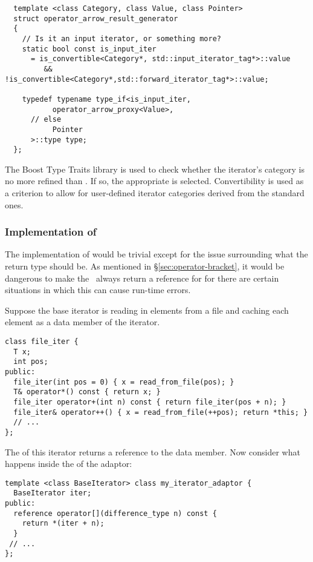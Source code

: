 \documentclass{netobjectdays}
\newcommand{\iteratoradaptor}{\code{iterator\_\-adaptor}}
\begin{document}
{\footnotesize
\begin{verbatim}
  template <class Category, class Value, class Pointer>
  struct operator_arrow_result_generator
  {
    // Is it an input iterator, or something more?
    static bool const is_input_iter
      = is_convertible<Category*, std::input_iterator_tag*>::value
         && !is_convertible<Category*,std::forward_iterator_tag*>::value;

    typedef typename type_if<is_input_iter,
           operator_arrow_proxy<Value>,
      // else
           Pointer
      >::type type;
  };
\end{verbatim}
}

The Boost Type Traits library is used to check whether the iterator's
category is no more refined than . If so,
the appropriate  is selected.
Convertibility is used as a criterion to allow for user-defined
iterator categories derived from the standard ones.


\subsubsection{Implementation of }
\label{sec:op-bracket-impl}

The implementation of  would be trivial except for
the issue surrounding what the return type should be.  As mentioned in
\S\ref{sec:operator-bracket}, it would be dangerous to make the
\iteratoradaptor\ always return a reference for
 for there are certain situations in which this can
cause run-time errors.

Suppose the base iterator is reading in elements from a file and
caching each element as a data member of the iterator.

{\footnotesize
\begin{verbatim}
class file_iter {
  T x;
  int pos;
public:
  file_iter(int pos = 0) { x = read_from_file(pos); }
  T& operator*() const { return x; }
  file_iter operator+(int n) const { return file_iter(pos + n); }
  file_iter& operator++() { x = read_from_file(++pos); return *this; }
  // ...
};
\end{verbatim}
}

\noindent The  of this iterator returns a reference to
the data member. Now consider what happens inside the
 of the adaptor:

{\footnotesize
\begin{verbatim}
template <class BaseIterator> class my_iterator_adaptor {
  BaseIterator iter;
public:
  reference operator[](difference_type n) const {
    return *(iter + n);
  }
 // ...
};
\end{verbatim}
}
\end{document}

